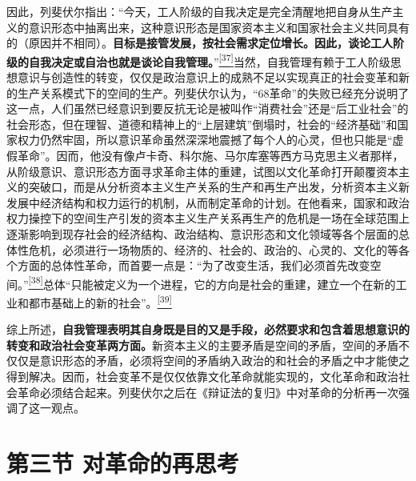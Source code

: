 \documentclass[UTF8, fontset = sourcesans, a4paper, oneside, zihao =
-4, scheme=chinese, no-math, space=true]{ctexbook}
\begin{document}
因此，列斐伏尔指出：``今天，工人阶级的自我决定是完全清醒地把自身从生产主义的意识形态中抽离出来，这种意识形态是国家资本主义和国家社会主义共同具有的（原因并不相同）。\textbf{目标是接管发展，按社会需求定位增长。因此，谈论工人阶级的自我决定或自治也就是谈论自我管理。}''\protect\hypertarget{part0008_split_002.htmlux5cux23w37}{}{}\protect\hyperlink{part0008_split_003.htmlux5cux23m37}{\textsuperscript{{[}37{]}}}当然，自我管理有赖于工人阶级思想意识与创造性的转变，仅仅是政治意识上的成熟不足以实现真正的社会变革和新的生产关系模式下的空间的生产。列斐伏尔认为，``68革命''的失败已经充分说明了这一点，人们虽然已经意识到要反抗无论是被叫作``消费社会''还是``后工业社会''的社会形态，但在理智、道德和精神上的``上层建筑''倒塌时，社会的``经济基础''和国家权力仍然牢固，所以意识革命虽然深深地震撼了每个人的心灵，但也只能是``虚假革命''。因而，他没有像卢卡奇、科尔施、马尔库塞等西方马克思主义者那样，从阶级意识、意识形态方面寻求革命主体的重建，试图以文化革命打开颠覆资本主义的突破口，而是从分析资本主义生产关系的生产和再生产出发，分析资本主义新发展中经济结构和权力运行的机制，从而制定革命的计划。在他看来，国家和政治权力操控下的空间生产引发的资本主义生产关系再生产的危机是一场在全球范围上逐渐影响到现存社会的经济结构、政治结构、意识形态和文化领域等各个层面的总体性危机，必须进行一场物质的、经济的、社会的、政治的、心灵的、文化的等各个方面的总体性革命，而首要一点是：``为了改变生活，我们必须首先改变空间。''\protect\hypertarget{part0008_split_002.htmlux5cux23w38}{}{}\protect\hyperlink{part0008_split_003.htmlux5cux23m38}{\textsuperscript{{[}38{]}}}总体``只能被定义为一个进程，它的方向是社会的重建，建立一个在新的工业和都市基础上的新的社会''。\protect\hypertarget{part0008_split_002.htmlux5cux23w39}{}{}\protect\hyperlink{part0008_split_003.htmlux5cux23m39}{\textsuperscript{{[}39{]}}}

综上所述，\textbf{自我管理表明其自身既是目的又是手段，必然要求和包含着思想意识的转变和政治社会变革两方面。}新资本主义的主要矛盾是空间的矛盾，空间的矛盾不仅仅是意识形态的矛盾，必须将空间的矛盾纳入政治的和社会的矛盾之中才能使之得到解决。因而，社会变革不是仅仅依靠文化革命就能实现的，文化革命和政治社会革命必须结合起来。列斐伏尔之后在《辩证法的复归》中对革命的分析再一次强调了这一观点。

\protect\hypertarget{part0008_split_003.html}{}{}

\hypertarget{part0008_split_003.htmlux5cux23b013}{\section{第三节
对革命的再思考}\label{part0008_split_003.htmlux5cux23b013}}
\end{document}
